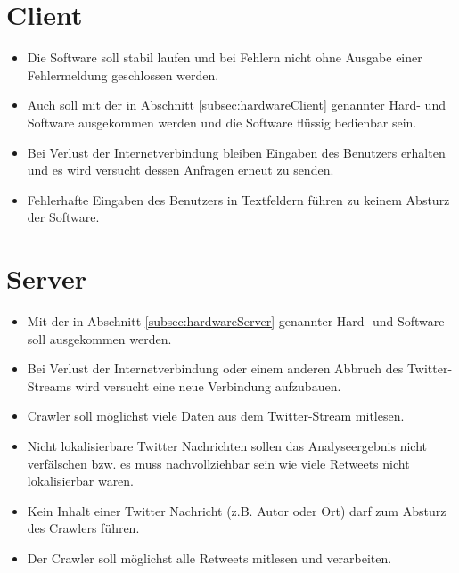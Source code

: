 
\section{Client}
\begin{itemize}
	\item Die Software soll stabil laufen und bei Fehlern nicht ohne Ausgabe einer Fehlermeldung geschlossen werden.
	\item Auch soll mit der in Abschnitt \ref{subsec:hardwareClient} genannter Hard- und Software ausgekommen werden und die Software flüssig bedienbar sein.
	\item Bei Verlust der Internetverbindung bleiben Eingaben des Benutzers erhalten und es wird versucht dessen Anfragen erneut zu senden.
	\item Fehlerhafte Eingaben des Benutzers in Textfeldern führen zu keinem Absturz der Software.
\end{itemize}
\section{Server}
\begin{itemize}
	\item Mit der in Abschnitt \ref{subsec:hardwareServer} genannter Hard- und Software soll ausgekommen werden.
	\item Bei Verlust der Internetverbindung oder einem anderen Abbruch des Twitter-Streams wird versucht eine neue Verbindung aufzubauen.
	\item Crawler soll möglichst viele Daten aus dem Twitter-Stream mitlesen.
	\item Nicht lokalisierbare Twitter Nachrichten sollen das Analyseergebnis nicht verfälschen bzw. es muss nachvollziehbar sein wie viele Retweets nicht lokalisierbar waren.
	\item Kein Inhalt einer Twitter Nachricht (z.B. Autor oder Ort) darf zum Absturz des Crawlers führen.
	\item Der Crawler soll möglichst alle Retweets mitlesen und verarbeiten.
\end{itemize}
